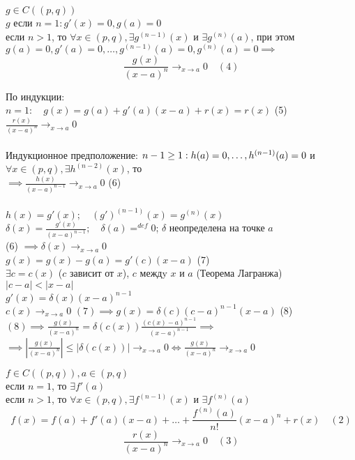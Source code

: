 \begin{lemma}
	$g \in C((p,q))$ \\
	$g$ если  $n=1: g'(x)=0, g(a)=0$ \\
	если $n>1$, то $\forall x \in (p,q), \exists g^{(n-1)}(x)$ и $\exists g^{(n)}(a)$, при этом \\
	$g(a)=0, g'(a)=0, \ldots, g^{(n-1)}(a)=0, g^{(n)}(a)=0 \implies$ \\
	\[
	\displaystyle\frac{g(x)}{(x-a)^{n}}\to_{x \to a} 0 \quad (4)
	\] 
\end{lemma}
\begin{replacementproof}
	По индукции:\\
	$n = 1: \quad g(x)=g(a)+g'(a)(x-a)+r(x)=r(x)$ (5)\\
	$\displaystyle\frac{r(x)}{(x-a)^{n}} \to_{x \to a} 0$\\
	\\
	Индукционное предположение: $n-1\ge 1:\\ h(a)=0,\ldots,h^{(n-1)}(a)=0$ и $\forall x \in (p,q), \exists h^{(n-2)}(x)$, то\\
	$\implies \displaystyle\frac{h(x)}{(x-a)^{n-1}}\to_{x\to a} 0$ (6)\\
	\\
	$h(x)=g'(x); \quad (g')^{(n-1)}(x)=g^{(n)}(x)$ \\
	$\delta(x)=\displaystyle\frac{g'(x)}{(x-a)^{n-1}}; \quad  \delta(a)=^{def}0$; \quad $\delta$ неопределена на точке $a$ \\
	(6) $\implies \delta(x) \to_{x\to a} 0$\\
	$g(x)=g(x)-g(a)=g'(c)(x-a)$ (7)\\
	$\exists c = c(x)$ ($c$ зависит от $x$), $c$ междy $x$ и $a$ (Теорема Лагранжа)\\
	$|c-a|<|x-a|$\\
	$g'(x)=\delta(x)(x-a)^{n-1}$ \\
	$c(x) \to_{x\to a} 0$
	$(7) \implies g(x)=\delta(c)(c-a)^{n-1}(x-a)$ (8)\\
	$(8) \implies \displaystyle\frac{g(x)}{(x-a)^{n}}=\delta(c(x))\displaystyle\frac{(c(x)-a)^{n-1}}{(x-a)^{n-1}} \implies$\\
	$\implies |\displaystyle\frac{g(x)}{(x-a)^{n}}|\le |\delta(c(x))| \to_{x\to a} 0 \iff \displaystyle\frac{g(x)}{(x-a)^{n}} \to_{x\to a} 0$
\end{replacementproof}
\begin{theorem}
	$f \in C((p,q)), a \in (p,q)$ \\
	если $n=1$, то $\exists f'(a)$ \\
	если $n>1$, то  $\forall x \in (p,q), \exists f^{(n-1)}(x)$ и $\exists f^{(n)}(a)$ \\
	\[
	f(x)=f(a)+f'(a)(x-a)+\ldots+\displaystyle\frac{f^{(n)}(a)}{n!}(x-a)^{n}+r(x) \quad (2)
	\] 
	\[
	\displaystyle\frac{r(x)}{(x-a)^{n}} \displaystyle\to_{x\to a} 0 \quad (3)
	\] 
\end{theorem}
